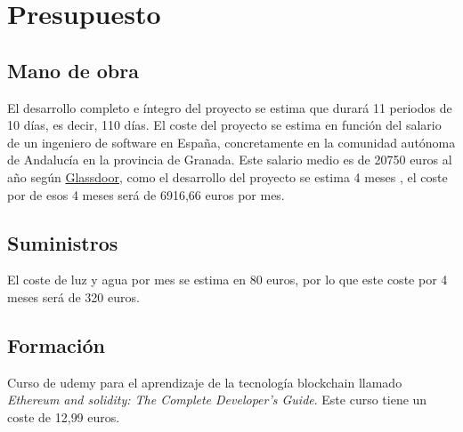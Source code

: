 \section{Presupuesto}

\subsection{Mano de obra}
El desarrollo completo e íntegro del proyecto se estima que durará 11 periodos de 10 días, es decir, 110 días. El coste del proyecto se estima en función del salario de un ingeniero de software en España, concretamente en la comunidad autónoma de Andalucía en la provincia de Granada. Este salario medio es de 20750 euros al año según \href{https://www.glassdoor.es/Sueldos/granada-junior-software-engineer-sueldo-SRCH_IL.0,7_IC2614045_KO8,32.htm}{Glassdoor}, como el desarrollo del proyecto se estima 4 meses , el coste por de esos 4 meses será de 6916{,}66 euros por mes.\\

\subsection{Suministros}
El coste de luz y agua por mes se estima en 80 euros, por lo que este coste por 4 meses será de 320 euros.\\

\subsection{Formación}
Curso de udemy para el aprendizaje de la tecnología blockchain llamado \textit{Ethereum and solidity: The Complete Developer's Guide}. Este curso tiene un coste de 12{,}99 euros.\\

